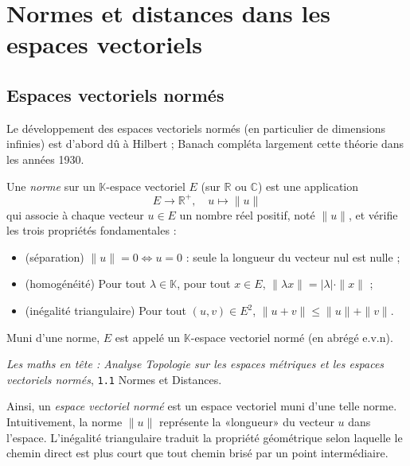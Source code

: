 \chapter{Normes et distances dans les espaces vectoriels} \label{chap:norme}

\section{Espaces vectoriels norm\'es}

\begin{Note}
Le d\'eveloppement des espaces vectoriels norm\'es (en particulier de dimensions
infinies) est d’abord d\^u \`a Hilbert ; Banach compl\'eta largement cette
th\'eorie dans les ann\'ees 1930.
\end{Note}

Une \emph{norme} sur un \(\mathbb{K}\)-espace vectoriel \(E\) (sur \(\mathbb{R}\) ou \(\mathbb{C}\)) est une application
\[
E \to \mathbb{R}^+,\quad u \mapsto \|u\|
\]
qui associe \`a chaque vecteur \(u\in E\) un nombre r\'eel positif, not\'e \(\|u\|\), et v\'erifie les trois propri\'et\'es fondamentales :
\begin{itemize}
  \item (s\'eparation) \(\|u\|=0 \iff u=0\) : seule la longueur du vecteur nul est nulle ;
  \item (homog\'en\'eit\'e) Pour tout \(\lambda\in\mathbb{K}\), pour tout \(x\in E\), \(\|\lambda x\|=|\lambda|\cdot\|x\|\) ;
  \item (in\'egalit\'e triangulaire) Pour tout \((u,v)\in E^2\), \(\|u+v\|\le \|u\|+\|v\|\).
\end{itemize}

Muni d’une norme, \(E\) est appel\'e un \(\mathbb{K}\)-espace vectoriel norm\'e (en abr\'eg\'e e.v.n).

\begin{Note}
    \emph{Les maths en t\^ete : Analyse} \Cite{Gourdon-analyse} \textit{Topologie sur les espaces m\'etriques
    et les espaces vectoriels norm\'es}, \texttt{1.1} Normes et Distances.
\end{Note}

Ainsi, un \emph{espace vectoriel norm\'e} est un espace vectoriel muni d’une telle norme.
Intuitivement, la norme \(\|u\|\) repr\'esente la «longueur» du vecteur \(u\) dans l’espace.
L’in\'egalit\'e triangulaire traduit la propri\'et\'e g\'eom\'etrique selon laquelle le chemin direct
est plus court que tout chemin bris\'e par un point interm\'ediaire.

